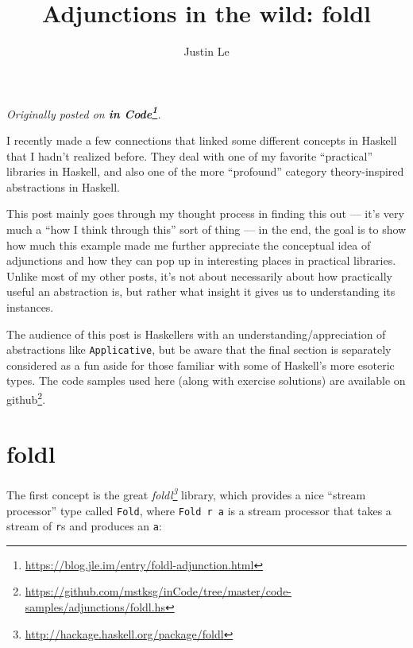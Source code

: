 \documentclass[]{article}
\title{Adjunctions in the wild: foldl}
\author{Justin Le}
\renewcommand{\href}[2]{#2\footnote{\url{#1}}}
\begin{document}
\maketitle

\emph{Originally posted on
\textbf{\href{https://blog.jle.im/entry/foldl-adjunction.html}{in Code}}.}

I recently made a few connections that linked some different concepts in Haskell
that I hadn't realized before. They deal with one of my favorite ``practical''
libraries in Haskell, and also one of the more ``profound'' category
theory-inspired abstractions in Haskell.

This post mainly goes through my thought process in finding this out --- it's
very much a ``how I think through this'' sort of thing --- in the end, the goal
is to show how much this example made me further appreciate the conceptual idea
of adjunctions and how they can pop up in interesting places in practical
libraries. Unlike most of my other posts, it's not about necessarily about how
practically useful an abstraction is, but rather what insight it gives us to
understanding its instances.

The audience of this post is Haskellers with an understanding/appreciation of
abstractions like \texttt{Applicative}, but be aware that the final section is
separately considered as a fun aside for those familiar with some of Haskell's
more esoteric types. The code samples used here (along with exercise solutions)
are
\href{https://github.com/mstksg/inCode/tree/master/code-samples/adjunctions/foldl.hs}{available
on github}.

\hypertarget{foldl}{%
\section{foldl}\label{foldl}}

The first concept is the great
\emph{\href{http://hackage.haskell.org/package/foldl}{foldl}} library, which
provides a nice ``stream processor'' type called \texttt{Fold}, where
\texttt{Fold\ r\ a} is a stream processor that takes a stream of \texttt{r}s and
produces an \texttt{a}:
\end{document}
